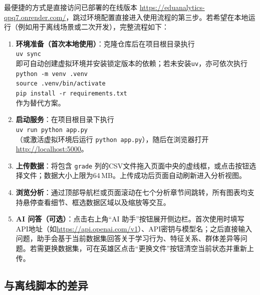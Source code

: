 \documentclass[UTF8, 12pt, a4paper]{ctexart}
\begin{document}
最便捷的方式是直接访问已部署的在线版本 \url{https://eduanalytics-qpq7.onrender.com/}，跳过环境配置直接进入使用流程的第三步。若希望在本地运行（例如用于离线场景或二次开发），完整流程如下：
\begin{enumerate}
    \item \textbf{环境准备（首次本地使用）}：克隆仓库后在项目根目录执行\\
          \indent\indent\texttt{uv sync}\\
          即可自动创建虚拟环境并安装锁定版本的依赖；若未安装\texttt{uv}，亦可依次执行\\
          \indent\indent\texttt{python -m venv .venv}\\
          \indent\indent\texttt{source .venv/bin/activate}\\
          \indent\indent\texttt{pip install -r requirements.txt}\\
          作为替代方案。
    \item \textbf{启动服务}：在项目根目录下执行\\
          \indent\indent\texttt{uv run python app.py}\\
          （或激活虚拟环境后运行 \texttt{python app.py}），随后在浏览器打开 \url{http://localhost:5000}。
    \item \textbf{上传数据}：将包含 \texttt{grade} 列的CSV文件拖入页面中央的虚线框，或点击按钮选择文件；数据大小上限为64\,MB。上传成功后页面自动刷新进入分析视图。
    \item \textbf{浏览分析}：通过顶部导航栏或页面滚动在七个分析章节间跳转，所有图表均支持悬停查看细节、框选数据区域以及缩放等交互。
    \item \textbf{AI 问答（可选）}：点击右上角“AI 助手”按钮展开侧边栏。首次使用时填写API地址（如\url{https://api.openai.com/v1}）、API密钥与模型名；之后直接输入问题，助手会基于当前数据集回答关于学习行为、特征关系、群体差异等问题。若需更换数据集，可在英雄区点击“更换文件”按钮清空当前状态并重新上传。
\end{enumerate}

\subsection{与离线脚本的差异}
\end{document}
